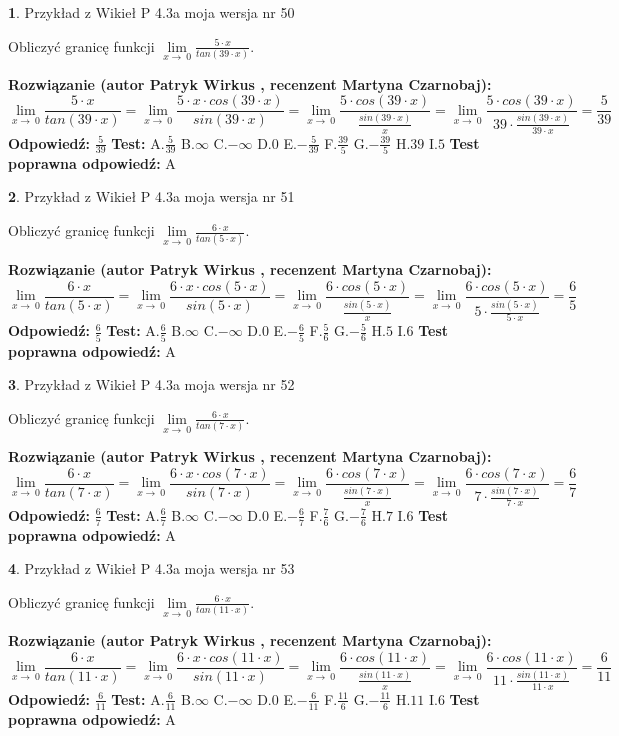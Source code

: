 \documentclass[12pt, a4paper]{article}
\theoremstyle{definition} %
\newtheorem{zad}{}
\newcommand{\zadStart}[1]{\begin{zad}#1\newline}
\newcommand{\zadStop}{\end{zad}}
\newcommand{\rozwStart}[2]{\noindent \textbf{Rozwiązanie (autor #1 , recenzent #2): }\newline}
\newcommand{\rozwStop}{\newline}
\newcommand{\odpStart}{\noindent \textbf{Odpowiedź:}\newline}
\newcommand{\odpStop}{\newline}
\newcommand{\testStart}{\noindent \textbf{Test:}\newline}
\newcommand{\testStop}{\newline}
\newcommand{\kluczStart}{\noindent \textbf{Test poprawna odpowiedź:}\newline}
\newcommand{\kluczStop}{\newline}
\begin{document}
\zadStart{Przykład z Wikieł P 4.3a moja wersja nr 50}


Obliczyć granicę funkcji $\lim\limits_{x\to\ 0}\frac{5 \cdot x}{tan(39 \cdot x)}$.
\zadStop
\rozwStart{Patryk Wirkus}{Martyna Czarnobaj}
$$\lim\limits_{x\to\ 0}\frac{5 \cdot x}{tan(39 \cdot x)}=\lim\limits_{x\to\ 0}\frac{5 \cdot x \cdot cos(39 \cdot x)}{sin(39 \cdot x)}=\lim\limits_{x\to\ 0}\frac{5 \cdot cos(39 \cdot x)}{\frac{sin(39 \cdot x)}{x}}=\lim\limits_{x\to\ 0}\frac{5 \cdot cos(39 \cdot x)}{39 \cdot \frac{sin(39 \cdot x)}{39 \cdot x}} = \frac{5}{39}$$
\rozwStop
\odpStart
$\frac{5}{39}$
\odpStop
\testStart
A.$\frac{5}{39}$
B.$\infty$
C.$-\infty$
D.$0$
E.$-\frac{5}{39}$
F.$\frac{39}{5}$
G.$-\frac{39}{5}$
H.$39$
I.$5$
\testStop
\kluczStart
A
\kluczStop



\zadStart{Przykład z Wikieł P 4.3a moja wersja nr 51}


Obliczyć granicę funkcji $\lim\limits_{x\to\ 0}\frac{6 \cdot x}{tan(5 \cdot x)}$.
\zadStop
\rozwStart{Patryk Wirkus}{Martyna Czarnobaj}
$$\lim\limits_{x\to\ 0}\frac{6 \cdot x}{tan(5 \cdot x)}=\lim\limits_{x\to\ 0}\frac{6 \cdot x \cdot cos(5 \cdot x)}{sin(5 \cdot x)}=\lim\limits_{x\to\ 0}\frac{6 \cdot cos(5 \cdot x)}{\frac{sin(5 \cdot x)}{x}}=\lim\limits_{x\to\ 0}\frac{6 \cdot cos(5 \cdot x)}{5 \cdot \frac{sin(5 \cdot x)}{5 \cdot x}} = \frac{6}{5}$$
\rozwStop
\odpStart
$\frac{6}{5}$
\odpStop
\testStart
A.$\frac{6}{5}$
B.$\infty$
C.$-\infty$
D.$0$
E.$-\frac{6}{5}$
F.$\frac{5}{6}$
G.$-\frac{5}{6}$
H.$5$
I.$6$
\testStop
\kluczStart
A
\kluczStop



\zadStart{Przykład z Wikieł P 4.3a moja wersja nr 52}


Obliczyć granicę funkcji $\lim\limits_{x\to\ 0}\frac{6 \cdot x}{tan(7 \cdot x)}$.
\zadStop
\rozwStart{Patryk Wirkus}{Martyna Czarnobaj}
$$\lim\limits_{x\to\ 0}\frac{6 \cdot x}{tan(7 \cdot x)}=\lim\limits_{x\to\ 0}\frac{6 \cdot x \cdot cos(7 \cdot x)}{sin(7 \cdot x)}=\lim\limits_{x\to\ 0}\frac{6 \cdot cos(7 \cdot x)}{\frac{sin(7 \cdot x)}{x}}=\lim\limits_{x\to\ 0}\frac{6 \cdot cos(7 \cdot x)}{7 \cdot \frac{sin(7 \cdot x)}{7 \cdot x}} = \frac{6}{7}$$
\rozwStop
\odpStart
$\frac{6}{7}$
\odpStop
\testStart
A.$\frac{6}{7}$
B.$\infty$
C.$-\infty$
D.$0$
E.$-\frac{6}{7}$
F.$\frac{7}{6}$
G.$-\frac{7}{6}$
H.$7$
I.$6$
\testStop
\kluczStart
A
\kluczStop



\zadStart{Przykład z Wikieł P 4.3a moja wersja nr 53}


Obliczyć granicę funkcji $\lim\limits_{x\to\ 0}\frac{6 \cdot x}{tan(11 \cdot x)}$.
\zadStop
\rozwStart{Patryk Wirkus}{Martyna Czarnobaj}
$$\lim\limits_{x\to\ 0}\frac{6 \cdot x}{tan(11 \cdot x)}=\lim\limits_{x\to\ 0}\frac{6 \cdot x \cdot cos(11 \cdot x)}{sin(11 \cdot x)}=\lim\limits_{x\to\ 0}\frac{6 \cdot cos(11 \cdot x)}{\frac{sin(11 \cdot x)}{x}}=\lim\limits_{x\to\ 0}\frac{6 \cdot cos(11 \cdot x)}{11 \cdot \frac{sin(11 \cdot x)}{11 \cdot x}} = \frac{6}{11}$$
\rozwStop
\odpStart
$\frac{6}{11}$
\odpStop
\testStart
A.$\frac{6}{11}$
B.$\infty$
C.$-\infty$
D.$0$
E.$-\frac{6}{11}$
F.$\frac{11}{6}$
G.$-\frac{11}{6}$
H.$11$
I.$6$
\testStop
\kluczStart
A
\kluczStop
\end{document}
